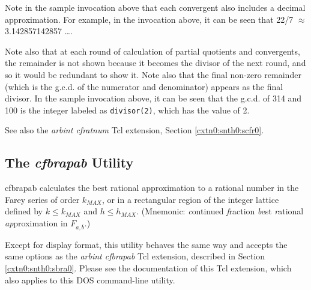 \begin{dosutilcommandsampleinvocations}
Note in the sample invocation above that each convergent
also includes a decimal approximation.  For example,
in the invocation above, it can be seen that 
22/7 $\approx$ 3.142857142857 \ldots{}.

Note also that at each round of calculation of partial
quotients and convergents, the remainder is not shown because
it becomes the divisor of the next round, and so it would be
redundant to show it.  Note also that the final non-zero remainder
(which is the g.c.d. of the numerator and denominator) 
appears as the final divisor.  In the sample
invocation above, it can be seen that the g.c.d. of
314 and 100 is the integer labeled as 
\texttt{divisor(2)}, which has the value of 2.
\end{dosutilcommandsampleinvocations}

\begin{dosutilcommandseealso}
See also the \emph{arbint cfratnum} Tcl extension, 
Section \cxtnzeroxrefhyphen{}\ref{cxtn0:snth0:scfr0}.
\end{dosutilcommandseealso}


\subsection{The \emph{cfbrapab} Utility}
\label{cdcm0:snth0:sbra0}

\begin{dosutilcommandname}{cfbrapab}%
calculates the best rational approximation to a
rational
number in the Farey series of order
$k_{MAX}$, or in a rectangular region of the integer lattice
defined by $k \leq k_{MAX}$ and $h \leq h_{MAX}$.
(Mnemonic:  \emph{c}ontinued
\emph{f}raction \emph{b}est \emph{r}ational \emph{ap}proximation
in $F_{a, \overline{b}}$.)
\end{dosutilcommandname}

\begin{dosutilcommanddescription}
Except for display format,
this utility behaves the same way and
accepts the same options as the \emph{arbint cfbrapab}
Tcl extension, described in Section \cxtnzeroxrefhyphen{}\ref{cxtn0:snth0:sbra0}.
Please see the documentation of this Tcl extension, which also applies
to this DOS command-line utility.
\end{dosutilcommanddescription}



